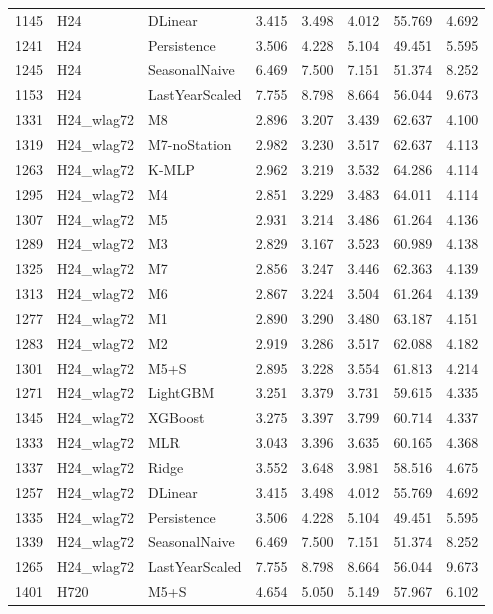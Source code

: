 \begin{tabular}{lllrrrrr}
1145 & H24 & DLinear & 3.415 & 3.498 & 4.012 & 55.769 & 4.692 \\
1241 & H24 & Persistence & 3.506 & 4.228 & 5.104 & 49.451 & 5.595 \\
1245 & H24 & SeasonalNaive & 6.469 & 7.500 & 7.151 & 51.374 & 8.252 \\
1153 & H24 & LastYearScaled & 7.755 & 8.798 & 8.664 & 56.044 & 9.673 \\
1331 & H24_wlag72 & M8 & 2.896 & 3.207 & 3.439 & 62.637 & 4.100 \\
1319 & H24_wlag72 & M7-noStation & 2.982 & 3.230 & 3.517 & 62.637 & 4.113 \\
1263 & H24_wlag72 & K-MLP & 2.962 & 3.219 & 3.532 & 64.286 & 4.114 \\
1295 & H24_wlag72 & M4 & 2.851 & 3.229 & 3.483 & 64.011 & 4.114 \\
1307 & H24_wlag72 & M5 & 2.931 & 3.214 & 3.486 & 61.264 & 4.136 \\
1289 & H24_wlag72 & M3 & 2.829 & 3.167 & 3.523 & 60.989 & 4.138 \\
1325 & H24_wlag72 & M7 & 2.856 & 3.247 & 3.446 & 62.363 & 4.139 \\
1313 & H24_wlag72 & M6 & 2.867 & 3.224 & 3.504 & 61.264 & 4.139 \\
1277 & H24_wlag72 & M1 & 2.890 & 3.290 & 3.480 & 63.187 & 4.151 \\
1283 & H24_wlag72 & M2 & 2.919 & 3.286 & 3.517 & 62.088 & 4.182 \\
1301 & H24_wlag72 & M5+S & 2.895 & 3.228 & 3.554 & 61.813 & 4.214 \\
1271 & H24_wlag72 & LightGBM & 3.251 & 3.379 & 3.731 & 59.615 & 4.335 \\
1345 & H24_wlag72 & XGBoost & 3.275 & 3.397 & 3.799 & 60.714 & 4.337 \\
1333 & H24_wlag72 & MLR & 3.043 & 3.396 & 3.635 & 60.165 & 4.368 \\
1337 & H24_wlag72 & Ridge & 3.552 & 3.648 & 3.981 & 58.516 & 4.675 \\
1257 & H24_wlag72 & DLinear & 3.415 & 3.498 & 4.012 & 55.769 & 4.692 \\
1335 & H24_wlag72 & Persistence & 3.506 & 4.228 & 5.104 & 49.451 & 5.595 \\
1339 & H24_wlag72 & SeasonalNaive & 6.469 & 7.500 & 7.151 & 51.374 & 8.252 \\
1265 & H24_wlag72 & LastYearScaled & 7.755 & 8.798 & 8.664 & 56.044 & 9.673 \\
1401 & H720 & M5+S & 4.654 & 5.050 & 5.149 & 57.967 & 6.102 \\

\end{tabular}
